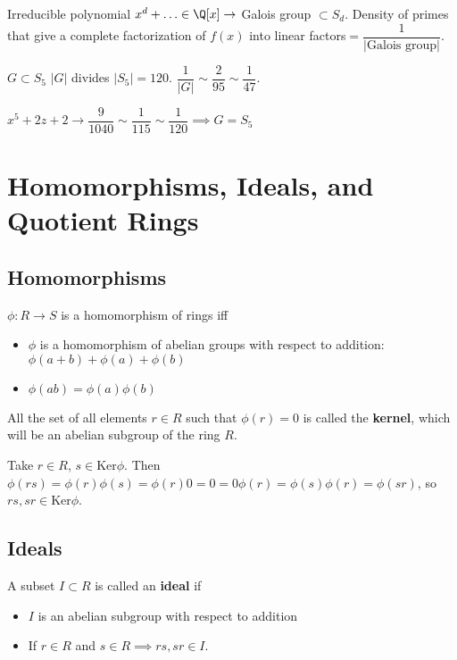 \documentclass[10pt]{article}
\newcommand{\Ker}{\text{Ker}}
\begin{document}
Irreducible polynomial $x^d + \ldots \in \Q[x] \to $ Galois group $\subset S_d$. Density of primes that give a complete factorization of $f(x)$ into linear factors$ = \dfrac{1}{|\text{Galois group}|}$.

$G\subset S_5$ $|G|$ divides $|S_5| = 120$. $\dfrac{1}{|G|} \sim \dfrac{2}{95}\sim \dfrac{1}{47}$.

$x^5 + 2z + 2 \to \dfrac{9}{1040} \sim \dfrac{1}{115} \sim \dfrac{1}{120}\implies G = S_5$

\section{Homomorphisms, Ideals, and Quotient Rings}
\subsection{Homomorphisms}
\begin{defn}
    $\phi: R \to S$ is a homomorphism of rings iff \begin{itemize}
        \item $\phi$ is a homomorphism of abelian groups with respect to addition: $\phi(a + b) + \phi(a) + \phi(b)$
        \item $\phi(ab) = \phi(a)\phi(b)$
    \end{itemize}
\end{defn}

\begin{defn}
    All the set of all elements $r\in R$ such that $\phi(r) = 0$ is called the \textbf{kernel}, which will be an abelian subgroup of the ring $R$.
\end{defn}

Take $r\in R$, $s\in \Ker\phi$. Then $\phi(rs) = \phi(r)\phi(s) = \phi(r)0 = 0 = 0\phi(r) = \phi(s)\phi(r) = \phi(sr)$, so $rs, sr \in \Ker\phi$.

\subsection{Ideals}
\begin{defn}
    A subset $I \subset R$ is called an \textbf{ideal} if \begin{itemize}
        \item $I$ is an abelian subgroup with respect to addition
        \item If $r\in R$ and $s\in R \implies rs, sr \in I$.
    \end{itemize}
\end{defn}
\end{document}
